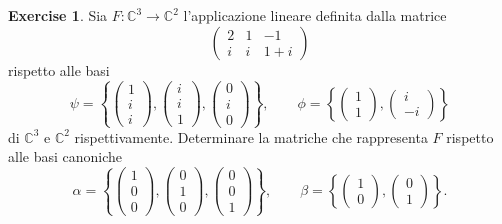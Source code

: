 \documentclass{article}
\theoremstyle{plain}
\theoremstyle{definition}
\newtheorem{xca}[exmp]{Exercise}
\theoremstyle{remark}
\begin{document}
\begin{bxthm}
\begin{xca}
    Sia $F:\mathbb{C}^3\to\mathbb{C}^2$ l'applicazione lineare definita dalla matrice
    \[\begin{pmatrix}
        2 & 1 & -1 \\
        i & i & 1+i
    \end{pmatrix}\]
    rispetto alle basi 
    \[\psi=\left\{\begin{pmatrix}
        1\\
        i\\
        i
    \end{pmatrix},\begin{pmatrix}
        i\\
        i\\
        1
    \end{pmatrix},\begin{pmatrix}
        0\\
        i\\
        0
    \end{pmatrix}\right\},\quad \quad \phi=\left\{\begin{pmatrix}
        1\\
        1
    \end{pmatrix},\begin{pmatrix}
        i\\
        -i
    \end{pmatrix}\right\}
    \]
    di $\mathbb{C}^3$ e $\mathbb{C}^2$ rispettivamente.
    Determinare la matriche che rappresenta $F$ rispetto alle basi canoniche
    \[\alpha=\left\{\begin{pmatrix}
        1\\
        0\\
        0
    \end{pmatrix},\begin{pmatrix}
        0\\
        1\\
        0
    \end{pmatrix},\begin{pmatrix}
        0\\
        0\\
        1
    \end{pmatrix}\right\},\quad \quad \beta=\left\{\begin{pmatrix}
        1\\
        0
    \end{pmatrix},\begin{pmatrix}
        0\\
        1
    \end{pmatrix}\right\}.
    \]
\end{xca}
\end{bxthm}
\end{document}
